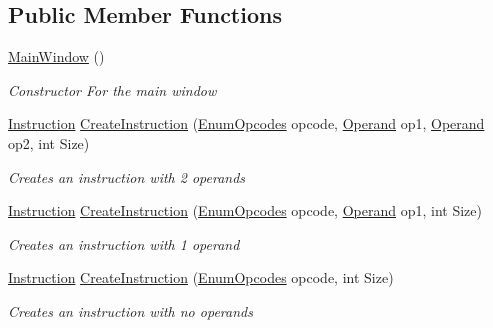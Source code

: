 \subsection*{Public Member Functions}
\begin{DoxyCompactItemize}
\item 
\hyperlink{class_c_p_u___o_s___simulator_1_1_main_window_a33462505a86657583c1560cbf02172bd}{Main\+Window} ()
\begin{DoxyCompactList}\small\item\em Constructor For the main window \end{DoxyCompactList}\item 
\hyperlink{class_c_p_u___o_s___simulator_1_1_c_p_u_1_1_instruction}{Instruction} \hyperlink{class_c_p_u___o_s___simulator_1_1_main_window_aeab49a3421f75049e47ed30b86bf8ad5}{Create\+Instruction} (\hyperlink{namespace_c_p_u___o_s___simulator_1_1_c_p_u_ac29c87bff87ad404c953b2581024043e}{Enum\+Opcodes} opcode, \hyperlink{class_c_p_u___o_s___simulator_1_1_c_p_u_1_1_operand}{Operand} op1, \hyperlink{class_c_p_u___o_s___simulator_1_1_c_p_u_1_1_operand}{Operand} op2, int Size)
\begin{DoxyCompactList}\small\item\em Creates an instruction with 2 operands \end{DoxyCompactList}\item 
\hyperlink{class_c_p_u___o_s___simulator_1_1_c_p_u_1_1_instruction}{Instruction} \hyperlink{class_c_p_u___o_s___simulator_1_1_main_window_a25a43c9a60f98f8196199d04420e48cf}{Create\+Instruction} (\hyperlink{namespace_c_p_u___o_s___simulator_1_1_c_p_u_ac29c87bff87ad404c953b2581024043e}{Enum\+Opcodes} opcode, \hyperlink{class_c_p_u___o_s___simulator_1_1_c_p_u_1_1_operand}{Operand} op1, int Size)
\begin{DoxyCompactList}\small\item\em Creates an instruction with 1 operand \end{DoxyCompactList}\item 
\hyperlink{class_c_p_u___o_s___simulator_1_1_c_p_u_1_1_instruction}{Instruction} \hyperlink{class_c_p_u___o_s___simulator_1_1_main_window_a608bc25c49d397aacde6cdd41d4314c3}{Create\+Instruction} (\hyperlink{namespace_c_p_u___o_s___simulator_1_1_c_p_u_ac29c87bff87ad404c953b2581024043e}{Enum\+Opcodes} opcode, int Size)
\begin{DoxyCompactList}\small\item\em Creates an instruction with no operands \end{DoxyCompactList}\item 

\end{DoxyCompactItemize}
